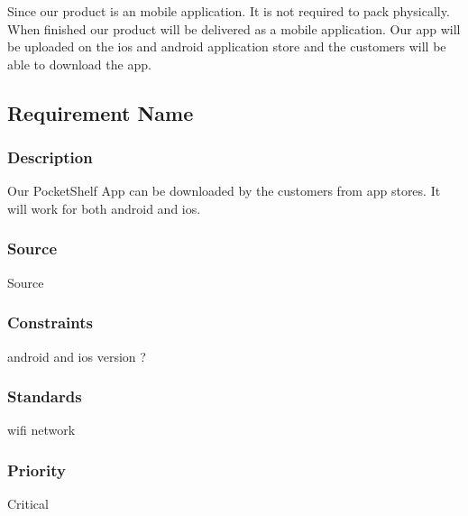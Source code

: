 Since our product is an mobile application. It is not required to pack physically. When finished our product will be delivered as a mobile application. Our app will be uploaded on the ios and android application store and the customers will be able to download the app.

\subsection{Requirement Name}
\subsubsection{Description}
Our PocketShelf App can be downloaded by the customers from app stores. It will work for both android and ios.
\subsubsection{Source}
Source
\subsubsection{Constraints}
android and ios version ?
\subsubsection{Standards}
wifi network
\subsubsection{Priority}
Critical